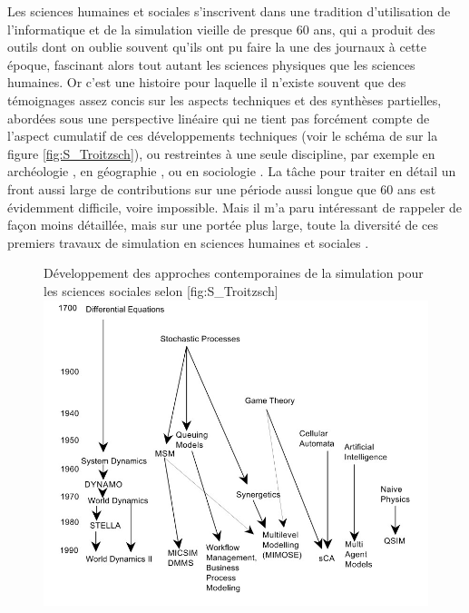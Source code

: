 Les sciences humaines et sociales s'inscrivent dans une tradition d'utilisation de l'informatique et de la simulation vieille de presque 60 ans, qui a produit des outils dont on oublie souvent qu'ils ont pu faire la une des journaux à cette époque, fascinant alors tout autant les sciences physiques que les sciences humaines. Or c'est une histoire pour laquelle il n'existe souvent que des témoignages assez concis sur les aspects techniques  et des synthèses partielles, abordées sous une perspective linéaire qui ne tient pas forcément compte de l'aspect cumulatif de ces développements techniques (voir le schéma de \autocite{Troitzsch1997} sur la figure \ref{fig:S_Troitzsch})⁠, ou restreintes à une seule discipline, par exemple en archéologie \autocite{Lake2013}, en géographie \autocite{Sanders2013}, ou en sociologie \autocite{Manzo2007}. La tâche pour traiter en détail un front aussi large de contributions sur une période aussi longue que 60 ans est évidemment difficile, voire impossible. Mais il m'a paru intéressant de rappeler de façon moins détaillée, mais sur une portée plus large, toute la diversité de ces premiers travaux de simulation en sciences humaines et sociales .

\begin{figure}[h]
\begin{sidecaption}{ Développement des approches contemporaines de la simulation pour les sciences sociales selon \textcite{Troitzsch1997}}[fig:S_Troitzsch]
 \centering
 \includegraphics[width=.9\linewidth]{lineaire_figure.jpg}
  \end{sidecaption}
\end{figure}


